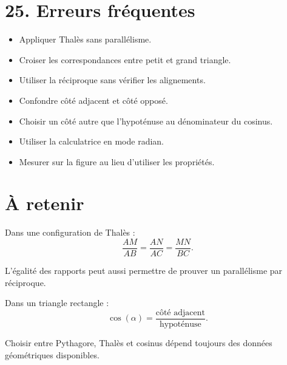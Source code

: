 \section{25. Erreurs fréquentes}

\begin{itemize}
\item Appliquer Thalès sans parallélisme.
\item Croiser les correspondances entre petit et grand triangle.
\item Utiliser la réciproque sans vérifier les alignements.
\item Confondre côté adjacent et côté opposé.
\item Choisir un côté autre que l'hypoténuse au dénominateur du cosinus.
\item Utiliser la calculatrice en mode radian.
\item Mesurer sur la figure au lieu d'utiliser les propriétés.
\end{itemize}

\section{À retenir}

\begin{aretenir}
Dans une configuration de Thalès :
\[
\boxed{
\dfrac{AM}{AB}
=
\dfrac{AN}{AC}
=
\dfrac{MN}{BC}
}.
\]

L'égalité des rapports peut aussi permettre de prouver un parallélisme par réciproque.

Dans un triangle rectangle :
\[
\boxed{
\cos(\alpha)
=
\dfrac{\text{côté adjacent}}{\text{hypoténuse}}
}.
\]

Choisir entre Pythagore, Thalès et cosinus dépend toujours des données géométriques disponibles.
\end{aretenir}
